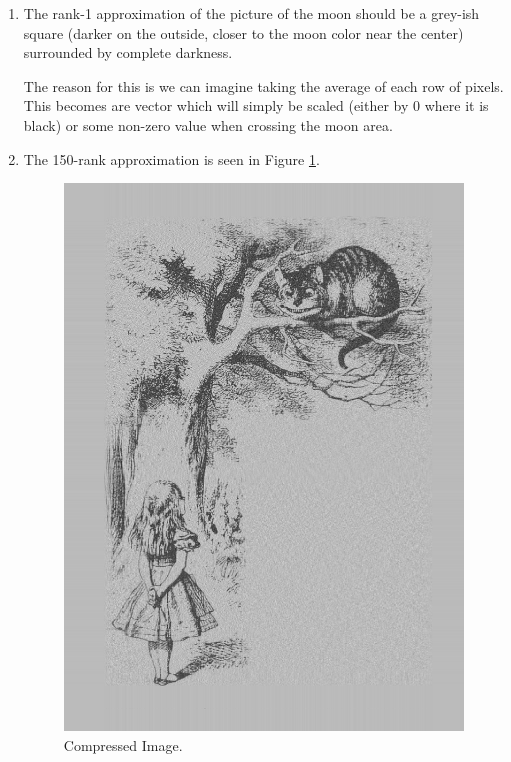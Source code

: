 \documentclass[12pt]{article}
\begin{document}
\begin{enumerate}[label=(\alph*)]
  \item
    The rank-1 approximation of the picture of the moon should be a grey-ish square (darker on the outside, closer to the moon color near the center) surrounded by complete darkness.

    The reason for this is we can imagine taking the average of each row of pixels. This becomes are vector which will simply be scaled (either by 0 where it is black) or some non-zero value when crossing the moon area. 

  \item The 150-rank approximation is seen in Figure \ref{fig:low_rank}.
    \begin{figure}[!ht]
      \centering
      \includegraphics[scale=0.34]{figures/low_rank_alice.png}
      \caption{Compressed Image.}
      \label{fig:low_rank}    
    \end{figure}

\end{enumerate}
\end{document}

